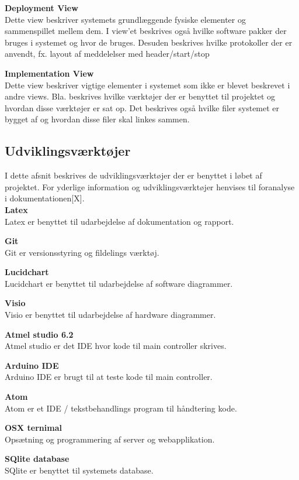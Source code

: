 \textbf{Deployment View}\\
Dette view beskriver systemets grundlæggende fysiske elementer og sammenspillet mellem dem. I view'et beskrives også hvilke software pakker der bruges i systemet og hvor de bruges. Desuden beskrives hvilke protokoller der er anvendt, fx. layout af meddelelser med header/start/stop

\textbf{Implementation View}\\
Dette view beskriver vigtige elementer i systemet som ikke er blevet beskrevet i andre views. Bla. beskrives hvilke værktøjer der er benyttet til projektet og hvordan disse værktøjer er sat op. Det beskrives også hvilke filer systemet er bygget af og hvordan disse filer skal linkes sammen.


\newpage
\subsection{Udviklingsværktøjer}
I dette afsnit beskrives de udviklingsværktøjer der er benyttet i løbet af projektet. For yderlige information og udviklingsværktøjer henvises til foranalyse i dokumentationen[X]. \\

\textbf{Latex}\\
Latex er benyttet til udarbejdelse af dokumentation og rapport. 

\textbf{Git}\\
Git er versionsstyring og fildelings værktøj.

\textbf{Lucidchart}\\
Lucidchart er benyttet til udarbejdelse af software diagrammer.

\textbf{Visio}\\
Visio er benyttet til udarbejdelse af hardware diagrammer.

\textbf{Atmel studio 6.2}\\
Atmel studio er det IDE hvor kode til main controller skrives.

\textbf{Arduino IDE}\\
Arduino IDE er brugt til at teste kode til main controller.

\textbf{Atom}\\
Atom er et IDE / tekstbehandlings program til håndtering kode.

\textbf{OSX ternimal}\\
Opsætning og programmering af server og webapplikation. 

\textbf{SQlite database}\\
SQlite er benyttet til systemets database.